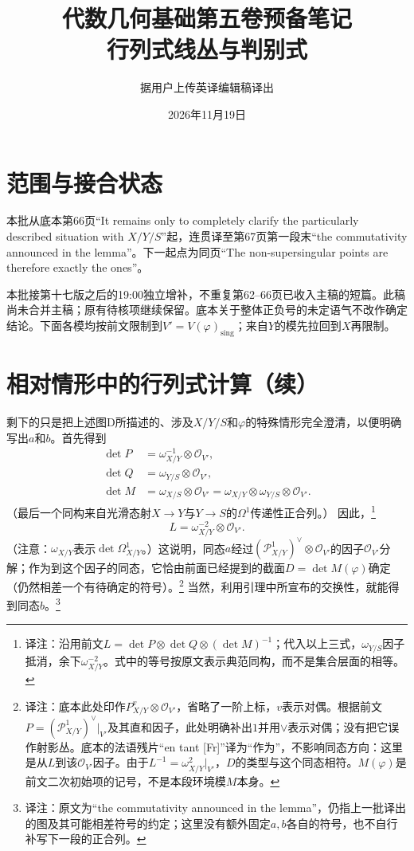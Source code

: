 \documentclass[openany,fontset=fandol]{ctexbook}
\newcommand{\note}[1]{\unskip\nobreak\footnote{译注：#1}}
\begin{document}
\title{代数几何基础第五卷预备笔记\\行列式线丛与判别式}
\author{据用户上传英译编辑稿译出}
\date{2026年11月19日}
\maketitle
\chapter*{范围与接合状态}
本批从底本第66页“It remains only to completely clarify the particularly described situation with $X/Y/S$”起，连贯译至第67页第一段末“the commutativity announced in the lemma”。下一起点为同页“The non-supersingular points are therefore exactly the ones”。

本批接第十七版之后的19:00独立增补，不重复第62--66页已收入主稿的短篇。此稿尚未合并主稿；原有待核项继续保留。底本关于整体正负号的未定语气不改作确定结论。下面各模均按前文限制到$V'=V(\varphi)_{\mathrm{sing}}$；来自$Y$的模先拉回到$X$再限制。
\chapter*{相对情形中的行列式计算（续）}
剩下的只是把上述图D所描述的、涉及$X/Y/S$和$\varphi$的特殊情形完全澄清，以便明确写出$a$和$b$。首先得到
\begin{align*}
\det P&=\omega_{X/Y}^{-1}\otimes\mathcal O_{V'},\\
\det Q&=\omega_{Y/S}\otimes\mathcal O_{V'},\\
\det M&=\omega_{X/S}\otimes\mathcal O_{V'}
       =\omega_{X/Y}\otimes\omega_{Y/S}\otimes\mathcal O_{V'}.
\end{align*}
（最后一个同构来自光滑态射$X\to Y$与$Y\to S$的$\Omega^1$传递性正合列。）
因此，\note{沿用前文$L=\det P\otimes\det Q\otimes(\det M)^{-1}$；代入以上三式，$\omega_{Y/S}$因子抵消，余下$\omega_{X/Y}^{-2}$。式中的等号按原文表示典范同构，而不是集合层面的相等。}
\[
L=\omega_{X/Y}^{-2}\otimes\mathcal O_{V'}.
\]
（注意：$\omega_{X/Y}$表示$\det\Omega^1_{X/Y}$。）这说明，同态$a$经过$(\mathcal P^1_{X/Y})^\vee\otimes\mathcal O_{V'}$的因子$\mathcal O_{V'}$分解；作为到这个因子的同态，它恰由前面已经提到的截面$D=\det M(\varphi)$确定（仍然相差一个有待确定的符号）。\note{底本此处印作$P^v_{X/Y}\otimes\mathcal O_{V'}$，省略了一阶上标，$v$表示对偶。根据前文$P=(\mathcal P^1_{X/Y})^\vee|_{V'}$及其直和因子，此处明确补出$1$并用$\vee$表示对偶；没有把它误作射影丛。底本的法语残片“en tant [Fr]”译为“作为”，不影响同态方向：这里是从$L$到该$\mathcal O_{V'}$因子。由于$L^{-1}=\omega_{X/Y}^{2}|_{V'}$，$D$的类型与这个同态相符。$M(\varphi)$是前文二次初始项的记号，不是本段环境模$M$本身。}
当然，利用引理中所宣布的交换性，就能得到同态$b$。\note{原文为“the commutativity announced in the lemma”，仍指上一批译出的图及其可能相差符号的约定；这里没有额外固定$a,b$各自的符号，也不自行补写下一段的正合列。}
\end{document}
